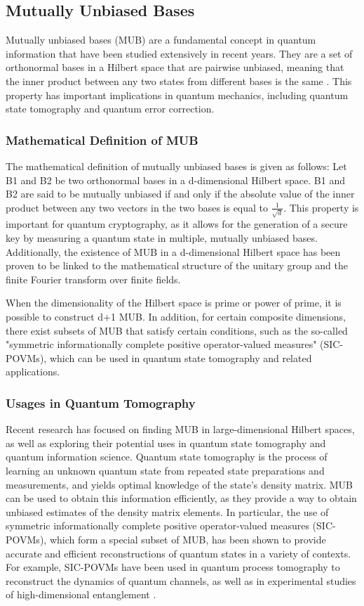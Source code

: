 \subsection{Mutually Unbiased Bases}\label{subsec:mutually-unbiased-bases}
Mutually unbiased bases (MUB) are a fundamental concept in quantum information that have been studied extensively in recent years.
They are a set of orthonormal bases in a Hilbert space that are pairwise unbiased, meaning that the inner product between
any two states from different bases is the same \cite{durt2010mutually}.
This property has important implications in quantum mechanics,
including quantum state tomography and quantum error correction.

\subsubsection{Mathematical Definition of MUB}\label{subsubsec:mathematical-definition-of-mub}
The mathematical definition of mutually unbiased bases is given as follows:
Let B1 and B2 be two orthonormal bases in a d-dimensional Hilbert space.
B1 and B2 are said to be mutually unbiased
if and only if the absolute value of the inner product between any two vectors in the two bases is equal to $\frac{1}{\sqrt {d}}$.
This property is important for quantum cryptography,
as it allows for the generation of a secure key by measuring a quantum state in multiple, mutually unbiased bases.
Additionally, the existence of MUB in a d-dimensional Hilbert space has been proven to be linked to the
mathematical structure of the unitary group and the finite Fourier transform over finite fields.

When the dimensionality of the Hilbert space is prime or power of prime, it is possible to construct d+1 MUB.
In addition, for certain composite dimensions, there exist subsets of MUB that satisfy certain conditions,
such as the so-called "symmetric informationally complete positive operator-valued measures" (SIC-POVMs),
which can be used in quantum state tomography and related applications.


\subsubsection{Usages in Quantum Tomography}
Recent research has focused on finding MUB in large-dimensional Hilbert spaces, as well as exploring their potential
uses in quantum state tomography and quantum information science.
Quantum state tomography is the process of learning an unknown quantum state from repeated state preparations and measurements,
and yields optimal knowledge of the state's density matrix. MUB can be used to obtain this information efficiently,
as they provide a way to obtain unbiased estimates of the density matrix elements. In particular, the use of symmetric
informationally complete positive operator-valued measures (SIC-POVMs), which form a special subset of MUB,
has been shown to provide accurate and efficient reconstructions of quantum states in a variety of contexts.
For example, SIC-POVMs have been used in quantum process tomography to reconstruct the dynamics of quantum channels,
as well as in experimental studies of high-dimensional entanglement \cite{ZhuHayashi2020}\cite{GrossEtAl2010}.


